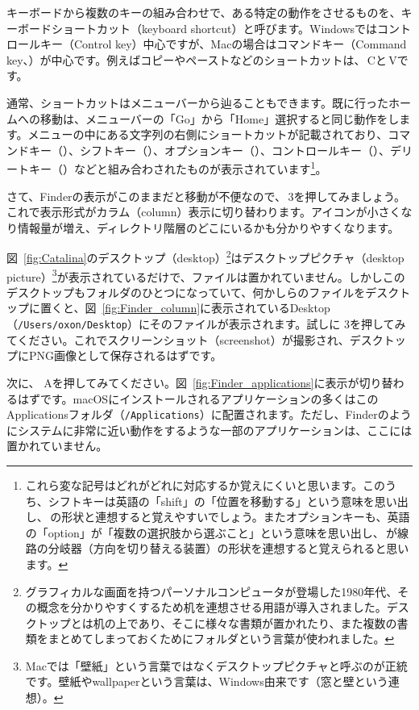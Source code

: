 キーボードから複数のキーの組み合わせで、ある特定の動作をさせるものを、キーボードショートカット（keyboard shortcut）と呼びます。Windowsではコントロールキー（Control key）中心ですが、Macの場合はコマンドキー（Command key、\cmdkey）が中心です。例えばコピーやペーストなどのショートカットは、\cmdkey\,Cと\cmdkey\,Vです。

通常、ショートカットはメニューバーから辿ることもできます。既に行ったホームへの移動は、メニューバーの「Go」から「Home」選択すると同じ動作をします。メニューの中にある文字列の右側にショートカットが記載されており、コマンドキー（\cmdkey）、シフトキー（\shiftkey）、オプションキー（\optkey）、コントロールキー（\ctlkey）、デリートキー（\delkey）などと組み合わされたものが表示されています\footnote{これら変な記号はどれがどれに対応するか覚えにくいと思います。このうち、シフトキーは英語の「shift」の「位置を移動する」という意味を思い出し、\shiftkey\,の形状と連想すると覚えやすいでしょう。またオプションキーも、英語の「option」が「複数の選択肢から選ぶこと」という意味を思い出し、\optkey\,が線路の分岐器（方向を切り替える装置）の形状を連想すると覚えられると思います。}。

さて、Finderの表示がこのままだと移動が不便なので、\cmdkey\,3を押してみましょう。これで表示形式がカラム（column）表示に切り替わります。アイコンが小さくなり情報量が増え、ディレクトリ階層のどこにいるかも分かりやすくなります。

図~\ref{fig:Catalina}のデスクトップ（desktop）\footnote{グラフィカルな画面を持つパーソナルコンピュータが登場した1980年代、その概念を分かりやすくするため机を連想させる用語が導入されました。デスクトップとは机の上であり、そこに様々な書類が置かれたり、また複数の書類をまとめてしまっておくためにフォルダという言葉が使われました。}はデスクトップピクチャ（desktop picture）\footnote{Macでは「壁紙」という言葉ではなくデスクトップピクチャと呼ぶのが正統です。壁紙やwallpaperという言葉は、Windows由来です（窓と壁という連想）。}が表示されているだけで、ファイルは置かれていません。しかしこのデスクトップもフォルダのひとつになっていて、何かしらのファイルをデスクトップに置くと、図~\ref{fig:Finder_column}に表示されているDesktop（\texttt{/Users/oxon/Desktop}）にそのファイルが表示されます。試しに\cmdkey\,\shiftkey\,3を押してみてください。これでスクリーンショット（screenshot）が撮影され、デスクトップにPNG画像として保存されるはずです。

次に、\cmdkey\,\shiftkey\,Aを押してみてください。図~\ref{fig:Finder_applications}に表示が切り替わるはずです。macOSにインストールされるアプリケーションの多くはこのApplicationsフォルダ（\texttt{/Applications}）に配置されます。ただし、Finderのようにシステムに非常に近い動作をするような一部のアプリケーションは、ここには置かれていません。

